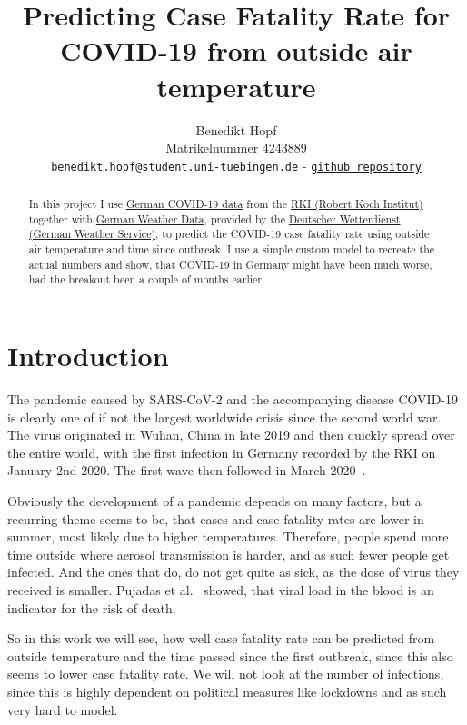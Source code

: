 \documentclass{article}
\title{Predicting Case Fatality Rate for COVID-19 from outside air temperature}
\author{%
  Benedikt Hopf\\
  Matrikelnummer 4243889\\
  \texttt{benedikt.hopf@student.uni-tuebingen.de} - \href{https://github.com/benedikthopf/DataLit-COVID-CFR-from-temperature}{\texttt{github repository}} \\
}
\begin{document}
\maketitle

\begin{abstract}

  In this project I use \href{https://www.arcgis.com/sharing/rest/content/items/f10774f1c63e40168479a1feb6c7ca74/data}{German COVID-19 data} from the \href{https://www.rki.de/DE/Home/homepage_node.html}{RKI (Robert Koch Institut)} together with \href{https://opendata.dwd.de/climate_environment/CDC/observations_germany/climate/hourly/air_temperature/}{German Weather Data}, provided by the \href{https://www.dwd.de/DE/Home/home_node.html}{Deutscher Wetterdienst (German Weather Service)}, to predict the COVID-19 case fatality rate using outside air temperature and time since outbreak. I use a simple custom model to recreate the actual numbers and show, that COVID-19 in Germany might have been much worse, had the breakout been a couple of months earlier.

\end{abstract}

\section{Introduction}
\label{sec:introduction}

The pandemic caused by SARS-CoV-2 and the accompanying disease COVID-19 is clearly one of if not the largest worldwide crisis since the second world war. The virus originated in Wuhan, China in late 2019 and then quickly spread over the entire world, with the first infection in Germany recorded by the RKI on January 2nd 2020. The first wave then followed in March 2020~\cite{rki_2022}.  

Obviously the development of a pandemic depends on many factors, but a recurring theme seems to be, that cases and case fatality rates are lower in summer, most likely due to higher temperatures. Therefore, people spend more time outside where aerosol transmission is harder, and as such fewer people get infected. And the ones that do, do not get quite as sick, as the dose of virus they received is smaller. Pujadas et al.~\cite{pujadas_chaudhry_mcbride_richter_zhao_wajnberg_nadkarni_glicksberg_houldsworth_cordon-cardo_et_al._2020} showed, that viral load in the blood is an indicator for the risk of death.

So in this work we will see, how well case fatality rate can be predicted from outside temperature and the time passed since the first outbreak, since this also seems to lower case fatality rate. We will not look at the number of infections, since this is highly dependent on political measures like lockdowns and as such very hard to model. 
\end{document}
